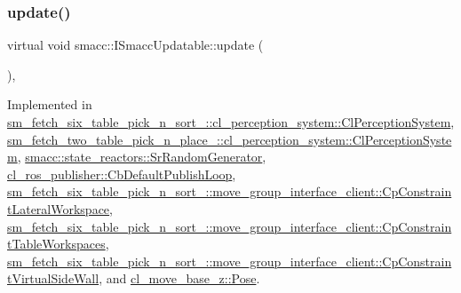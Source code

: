 \subsubsection{\texorpdfstring{update()}{update()}}
{\footnotesize\ttfamily virtual void smacc\+::\+I\+Smacc\+Updatable\+::update (\begin{DoxyParamCaption}{ }\end{DoxyParamCaption})\hspace{0.3cm}{\ttfamily [protected]}, {}}



Implemented in \hyperlink{classsm__fetch__six__table__pick__n__sort__1_1_1cl__perception__system_1_1ClPerceptionSystem_a87292907b7b771d19d91c6de47ea8d1d}{sm\+\_\+fetch\+\_\+six\+\_\+table\+\_\+pick\+\_\+n\+\_\+sort\+\_\+::cl\+\_\+perception\+\_\+system\+::\+Cl\+Perception\+System}, \hyperlink{classsm__fetch__two__table__pick__n__place__1_1_1cl__perception__system_1_1ClPerceptionSystem_ac6e10d6fc38d2b1d561875298307c235}{sm\+\_\+fetch\+\_\+two\+\_\+table\+\_\+pick\+\_\+n\+\_\+place\+\_\+::cl\+\_\+perception\+\_\+system\+::\+Cl\+Perception\+System}, \hyperlink{classsmacc_1_1state__reactors_1_1SrRandomGenerator_adf6e20208210f30639b92214e1dda83b}{smacc\+::state\+\_\+reactors\+::\+Sr\+Random\+Generator}, \hyperlink{classcl__ros__publisher_1_1CbDefaultPublishLoop_aef241d1976f0105643976545880d5e21}{cl\+\_\+ros\+\_\+publisher\+::\+Cb\+Default\+Publish\+Loop}, \hyperlink{classsm__fetch__six__table__pick__n__sort__1_1_1move__group__interface__client_1_1CpConstraintLateralWorkspace_a90a9740b4c6810933cb9f72e49c03a55}{sm\+\_\+fetch\+\_\+six\+\_\+table\+\_\+pick\+\_\+n\+\_\+sort\+\_\+::move\+\_\+group\+\_\+interface\+\_\+client\+::\+Cp\+Constraint\+Lateral\+Workspace}, \hyperlink{classsm__fetch__six__table__pick__n__sort__1_1_1move__group__interface__client_1_1CpConstraintTableWorkspaces_a2588601a0f45af921e1864f8ba765c51}{sm\+\_\+fetch\+\_\+six\+\_\+table\+\_\+pick\+\_\+n\+\_\+sort\+\_\+::move\+\_\+group\+\_\+interface\+\_\+client\+::\+Cp\+Constraint\+Table\+Workspaces}, \hyperlink{classsm__fetch__six__table__pick__n__sort__1_1_1move__group__interface__client_1_1CpConstraintVirtualSideWall_a7d2ea69b3e338590b4cc85bdce5838db}{sm\+\_\+fetch\+\_\+six\+\_\+table\+\_\+pick\+\_\+n\+\_\+sort\+\_\+::move\+\_\+group\+\_\+interface\+\_\+client\+::\+Cp\+Constraint\+Virtual\+Side\+Wall}, and \hyperlink{classcl__move__base__z_1_1Pose_abf99d1127cf51a93f97ada2031196114}{cl\+\_\+move\+\_\+base\+\_\+z\+::\+Pose}.



